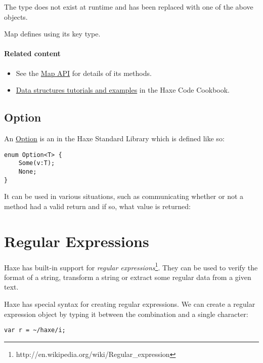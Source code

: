 The  type does not exist at runtime and has been replaced with one of the above objects. 

Map defines  using its key type.


\paragraph{Related content}
\begin{itemize}
	\item See the \href{https://api.haxe.org/Map.html}{Map API} for details of its methods.
	\item \href{http://code.haxe.org/category/data-structures/}{Data structures tutorials and examples} in the Haxe Code Cookbook.
\end{itemize}

\subsection{Option}
\label{std-Option}

An \href{https://api.haxe.org/haxe/ds/Option.html}{Option} is an  in the Haxe Standard Library which is defined like so:

\begin{lstlisting}
enum Option<T> {
	Some(v:T);
	None;
}
\end{lstlisting}

It can be used in various situations, such as communicating whether or not a method had a valid return and if so, what value is returned:



\section{Regular Expressions}
\label{std-regex}

Haxe has built-in support for \emph{regular expressions}\footnote{http://en.wikipedia.org/wiki/Regular_expression}. They can be used to verify the format of a string, transform a string or extract some regular data from a given text.

Haxe has special syntax for creating regular expressions. We can create a regular expression object by typing it between the \expr{\textasciitilde/} combination and a single \expr{/} character:

\begin{lstlisting}
var r = ~/haxe/i;
\end{lstlisting}

